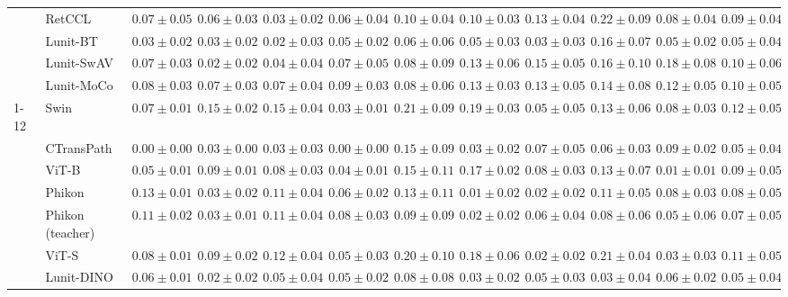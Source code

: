 \begin{tabular}{ll|cccc|c|cccc|c}
 & RetCCL & $0.07 \pm 0.05$ & $0.06 \pm 0.03$ & $0.03 \pm 0.02$ & $0.06 \pm 0.04$ & $0.10 \pm 0.04$ & $0.10 \pm 0.03$ & $0.13 \pm 0.04$ & $0.22 \pm 0.09$ & $0.08 \pm 0.04$ & $0.09 \pm 0.04$ \\
 & Lunit-BT & $0.03 \pm 0.02$ & $0.03 \pm 0.02$ & $0.02 \pm 0.03$ & $0.05 \pm 0.02$ & $0.06 \pm 0.06$ & $0.05 \pm 0.03$ & $\mathbf{0.03 \pm 0.03}$ & $0.16 \pm 0.07$ & $0.05 \pm 0.02$ & $0.05 \pm 0.04$ \\
 & Lunit-SwAV & $0.07 \pm 0.03$ & $0.02 \pm 0.02$ & $0.04 \pm 0.04$ & $0.07 \pm 0.05$ & $0.08 \pm 0.09$ & $0.13 \pm 0.06$ & $0.15 \pm 0.05$ & $0.16 \pm 0.10$ & $0.18 \pm 0.08$ & $0.10 \pm 0.06$ \\
 & Lunit-MoCo & $0.08 \pm 0.03$ & $0.07 \pm 0.03$ & $0.07 \pm 0.04$ & $0.09 \pm 0.03$ & $0.08 \pm 0.06$ & $0.13 \pm 0.03$ & $0.13 \pm 0.05$ & $0.14 \pm 0.08$ & $0.12 \pm 0.05$ & $0.10 \pm 0.05$ \\
\cline{1-12}
\multirow[t]{12}{*}{Mean pool} & Swin & $0.07 \pm 0.01$ & $0.15 \pm 0.02$ & $0.15 \pm 0.04$ & $0.03 \pm 0.01$ & $0.21 \pm 0.09$ & $0.19 \pm 0.03$ & $0.05 \pm 0.05$ & $0.13 \pm 0.06$ & $0.08 \pm 0.03$ & $0.12 \pm 0.05$ \\
 & CTransPath & $\mathbf{0.00 \pm 0.00}$ & $0.03 \pm 0.00$ & $0.03 \pm 0.03$ & $\mathbf{0.00 \pm 0.00}$ & $0.15 \pm 0.09$ & $0.03 \pm 0.02$ & $0.07 \pm 0.05$ & $0.06 \pm 0.03$ & $0.09 \pm 0.02$ & $0.05 \pm 0.04$ \\
 & ViT-B & $0.05 \pm 0.01$ & $0.09 \pm 0.01$ & $0.08 \pm 0.03$ & $0.04 \pm 0.01$ & $0.15 \pm 0.11$ & $0.17 \pm 0.02$ & $0.08 \pm 0.03$ & $0.13 \pm 0.07$ & $\mathbf{0.01 \pm 0.01}$ & $0.09 \pm 0.05$ \\
 & Phikon & $0.13 \pm 0.01$ & $0.03 \pm 0.02$ & $0.11 \pm 0.04$ & $0.06 \pm 0.02$ & $0.13 \pm 0.11$ & $\mathbf{0.01 \pm 0.02}$ & $\mathbf{0.02 \pm 0.02}$ & $0.11 \pm 0.05$ & $0.08 \pm 0.03$ & $0.08 \pm 0.05$ \\
 & Phikon (teacher) & $0.11 \pm 0.02$ & $0.03 \pm 0.01$ & $0.11 \pm 0.04$ & $0.08 \pm 0.03$ & $0.09 \pm 0.09$ & $0.02 \pm 0.02$ & $0.06 \pm 0.04$ & $0.08 \pm 0.06$ & $0.05 \pm 0.06$ & $0.07 \pm 0.05$ \\
 & ViT-S & $0.08 \pm 0.01$ & $0.09 \pm 0.02$ & $0.12 \pm 0.04$ & $0.05 \pm 0.03$ & $0.20 \pm 0.10$ & $0.18 \pm 0.06$ & $0.02 \pm 0.02$ & $0.21 \pm 0.04$ & $0.03 \pm 0.03$ & $0.11 \pm 0.05$ \\
 & Lunit-DINO & $0.06 \pm 0.01$ & $0.02 \pm 0.02$ & $0.05 \pm 0.04$ & $0.05 \pm 0.02$ & $\mathbf{0.08 \pm 0.08}$ & $0.03 \pm 0.02$ & $0.05 \pm 0.03$ & $0.03 \pm 0.04$ & $0.06 \pm 0.02$ & $\mathbf{0.05 \pm 0.04}$ \\

\end{tabular}
